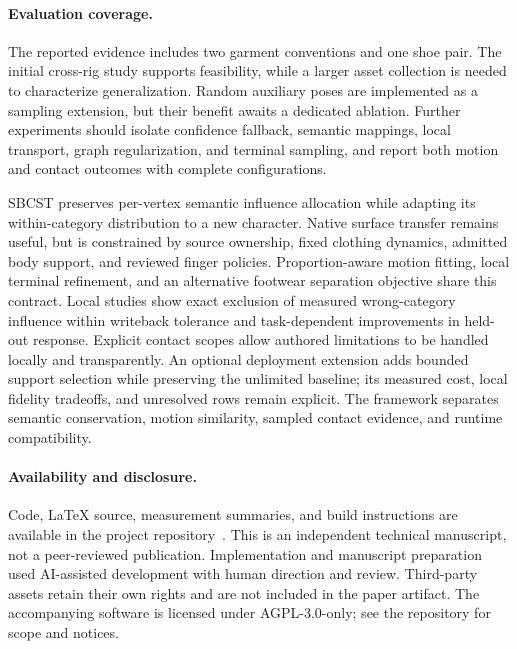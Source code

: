 \documentclass[10pt,twocolumn,letterpaper]{article}
\makeatletter
\renewcommand\section{\@startsection{section}{1}{\z@}{-2.0ex plus -.5ex minus -.2ex}{.9ex plus .2ex}{\normalfont\large\bfseries\raggedright}}
\makeatother
\begin{document}
\paragraph{Evaluation coverage.}
The reported evidence includes two garment conventions and one shoe pair. The initial cross-rig study supports feasibility, while a larger asset collection is needed to characterize generalization. Random auxiliary poses are implemented as a sampling extension, but their benefit awaits a dedicated ablation. Further experiments should isolate confidence fallback, semantic mappings, local transport, graph regularization, and terminal sampling, and report both motion and contact outcomes with complete configurations.

\section{Conclusion}
SBCST preserves per-vertex semantic influence allocation while adapting its within-category distribution to a new character. Native surface transfer remains useful, but is constrained by source ownership, fixed clothing dynamics, admitted body support, and reviewed finger policies. Proportion-aware motion fitting, local terminal refinement, and an alternative footwear separation objective share this contract. Local studies show exact exclusion of measured wrong-category influence within writeback tolerance and task-dependent improvements in held-out response. Explicit contact scopes allow authored limitations to be handled locally and transparently. An optional deployment extension adds bounded support selection while preserving the unlimited baseline; its measured cost, local fidelity tradeoffs, and unresolved rows remain explicit. The framework separates semantic conservation, motion similarity, sampled contact evidence, and runtime compatibility.

\paragraph{Availability and disclosure.}
Code, LaTeX source, measurement summaries, and build instructions are available in the project repository~\cite{artifact}. This is an independent technical manuscript, not a peer-reviewed publication. Implementation and manuscript preparation used AI-assisted development with human direction and review. Third-party assets retain their own rights and are not included in the paper artifact. The accompanying software is licensed under AGPL-3.0-only; see the repository for scope and notices.
\end{document}
